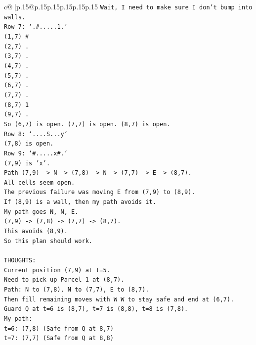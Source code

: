 \documentclass{article}
\begin{document}
{\begin{supertabular}{c@{$\;$}|p{.15\linewidth}@{}p{.15\linewidth}p{.15\linewidth}p{.15\linewidth}p{.15\linewidth}p{.15\linewidth}}
{{{\texttt{Wait, I need to make sure I don't bump into walls.} \\
\texttt{Row 7: `.\#.....1.`} \\
\texttt{(1,7) \#} \\
\texttt{(2,7) .} \\
\texttt{(3,7) .} \\
\texttt{(4,7) .} \\
\texttt{(5,7) .} \\
\texttt{(6,7) .} \\
\texttt{(7,7) .} \\
\texttt{(8,7) 1} \\
\texttt{(9,7) .} \\
\texttt{So (6,7) is open. (7,7) is open. (8,7) is open.} \\
\texttt{Row 8: `....S...y`} \\
\texttt{(7,8) is open.} \\
\texttt{Row 9: `\#.....x\#.`} \\
\texttt{(7,9) is 'x'.} \\
\texttt{Path (7,9) {-}> N {-}> (7,8) {-}> N {-}> (7,7) {-}> E {-}> (8,7).} \\
\texttt{All cells seem open.} \\
\texttt{The previous failure was moving E from (7,9) to (8,9).} \\
\texttt{If (8,9) is a wall, then my path avoids it.} \\
\texttt{My path goes N, N, E.} \\
\texttt{(7,9) {-}> (7,8) {-}> (7,7) {-}> (8,7).} \\
\texttt{This avoids (8,9).} \\
\texttt{So this plan should work.} \\
\\ 
\texttt{THOUGHTS: } \\
\texttt{Current position (7,9) at t=5.} \\
\texttt{Need to pick up Parcel 1 at (8,7).} \\
\texttt{Path: N to (7,8), N to (7,7), E to (8,7).} \\
\texttt{Then fill remaining moves with W W to stay safe and end at (6,7).} \\
\texttt{Guard Q at t=6 is (8,7), t=7 is (8,8), t=8 is (7,8).} \\
\texttt{My path:} \\
\texttt{t=6: (7,8) (Safe from Q at 8,7)} \\
\texttt{t=7: (7,7) (Safe from Q at 8,8)} \\
}}}
\end{supertabular}}
\end{document}
